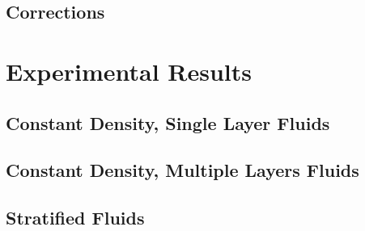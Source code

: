 \documentclass{article}
\begin{document}
\subsection{Corrections}

\section{Experimental Results}

\subsection{Constant Density, Single Layer Fluids}

\subsection{Constant Density, Multiple Layers Fluids}

\subsection{Stratified Fluids}
\end{document}
